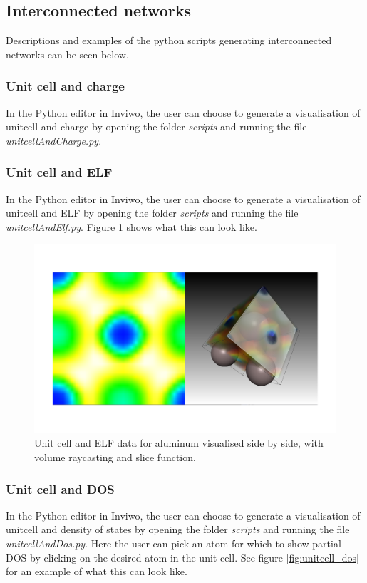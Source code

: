 \documentclass[a4paper,12pt]{article}
\begin{document}
\subsection{Interconnected networks}
Descriptions and examples of the python scripts generating interconnected networks can be seen below.

\subsubsection{Unit cell and charge}
In the Python editor in Inviwo, the user can choose to generate a visualisation of unitcell and charge by opening the folder \textit{scripts} and running the file \textit{unitcellAndCharge.py}.

\subsubsection{Unit cell and ELF}
In the Python editor in Inviwo, the user can choose to generate a visualisation of unitcell and ELF by opening the folder \textit{scripts} and running the file \textit{unitcellAndElf.py}. Figure \ref{fig:sammankoppling} shows what this can look like.

\begin{figure} [H]
\centering
\includegraphics[scale=0.25]{screenshot_sammankoppling_Al.png}
\caption{Unit cell and ELF data for aluminum visualised side by side, with volume raycasting and slice function.}
\label{fig:sammankoppling}
\end{figure}

\subsubsection{Unit cell and DOS}
\label{ch:unitcell_dos}
In the Python editor in Inviwo, the user can choose to generate a visualisation of unitcell and density of states by opening the folder \textit{scripts} and running the file \textit{unitcellAndDos.py}. Here the user can pick an atom for which to show partial DOS by clicking on the desired atom in the unit cell. See figure \ref{fig:unitcell_dos} for an example of what this can look like.
\end{document}
